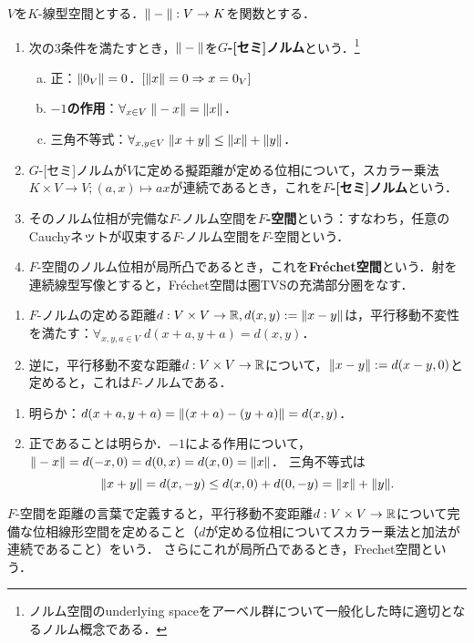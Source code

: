 \documentclass[uplatex,dvipdfmx]{jsreport}
\begin{document}
\begin{definition}
    $V$を$K$-線型空間とする．$\|-\|:V\to K$を関数とする．
    \begin{enumerate}
        \item 次の3条件を満たすとき，$\|-\|$を\textbf{$G$-[セミ]ノルム}という．\footnote{ノルム空間のunderlying spaceをアーベル群について一般化した時に適切となるノルム概念である．}
        \begin{enumerate}[(a)]
            \item 正：$\|0_V\|=0$．$[\|x\|=0\Rightarrow x=0_V]$
            \item \textbf{$-1$の作用}：$\forall_{x\in V}\;\|-x\|=\|x\|$．
            \item 三角不等式：$\forall_{x,y\in V}\;\|x+y\|\le\|x\|+\|y\|$．
        \end{enumerate}
        \item $G$-[セミ]ノルムが$V$に定める擬距離が定める位相について，スカラー乗法$K\times V\to V;(a,x)\mapsto ax$が連続であるとき，これを\textbf{$F$-[セミ]ノルム}という．
        \item そのノルム位相が完備な$F$-ノルム空間を\textbf{$F$-空間}という：すなわち，任意のCauchyネットが収束する$F$-ノルム空間を$F$-空間という．
        \item $F$-空間のノルム位相が局所凸であるとき，これを\textbf{Fréchet空間}という．射を連続線型写像とすると，Fréchet空間は圏TVSの充満部分圏をなす．
    \end{enumerate}
\end{definition}

\begin{lemma}\mbox{}
    \begin{enumerate}
        \item $F$-ノルムの定める距離$d:V\times V\to \mathbb{R},d(x,y):=\|x-y\|$は，平行移動不変性を満たす：$\forall_{x,y,a\in V}\;d(x+a,y+a)=d(x,y)$．
        \item 逆に，平行移動不変な距離$d:V\times V\to \mathbb{R}$について，$\|x-y\|:=d(x-y,0)$と定めると，これは$F$-ノルムである．
    \end{enumerate}
\end{lemma}
\begin{Proof}\mbox{}
    \begin{enumerate}
        \item 明らか：$d(x+a,y+a)=\|(x+a)-(y+a)\|=d(x,y)$．
        \item 正であることは明らか．$-1$による作用について，$\|-x\|=d(-x,0)=d(0,x)=d(x,0)=\|x\|$．
        三角不等式は
        \[\|x+y\|=d(x,-y)\le d(x,0)+d(0,-y)=\|x\|+\|y\|.\]
    \end{enumerate}
\end{Proof}
\begin{remarks}[距離の言葉による特徴付け]
    $F$-空間を距離の言葉で定義すると，平行移動不変距離$d:V\times V\to \mathbb{R}$について完備な位相線形空間を定めること（$d$が定める位相についてスカラー乗法と加法が連続であること）をいう．
    さらにこれが局所凸であるとき，Frechet空間という．
\end{remarks}
\end{document}
